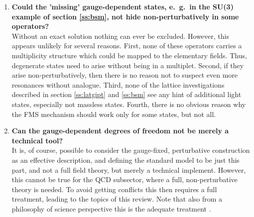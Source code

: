 \documentclass[final,12pt]{article}
\newcommand*{\1}{1\!\!\!\bot}
\begin{document}
\begin{enumerate}
 \item {\bf Could the 'missing' gauge-dependent states, e.\ g.\ in the SU(3) example of section \ref{ss:bsm}, not hide non-perturbatively in some operators?}\\
 Without an exact solution nothing can ever be excluded. However, this appears unlikely for several reasons. First, none of these operators carries a multiplicity structure which could be mapped to the elementary fields. Thus, degenerate states need to arise without being in a multiplet. Second, if they arise non-perturbatively, then there is no reason not to suspect even more resonances without analogue. Third, none of the lattice investigations described in section \ref{ss:latgipt} and \ref{ss:bsm} see any hint of additional light states, especially not massless states. Fourth, there is no obvious reason why the FMS mechanism should work only for some states, but not all.
 
 \item {\bf Can the gauge-dependent degrees of freedom not be merely a technical tool?}\\
 It is, of course, possible to consider the gauge-fixed, perturbative construction as an effective description, and defining the standard model to be just this part, and not a full field theory, but merely a technical implement. However, this cannot be true for the QCD subsector, where a full, non-perturbative theory is needed. To avoid getting conflicts this then requires a full treatment, leading to the topics of this review. Note that also from a philosophy of science perspective this is the adequate treatment \cite{Lyre:2008af,Francois:2017aa}.
 

\end{enumerate}
\end{document}
